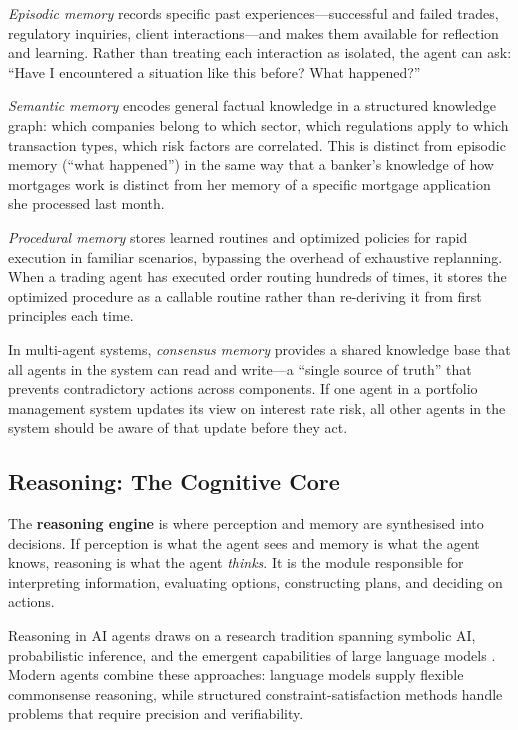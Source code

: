 \documentclass{article}
\begin{document}
\textit{Episodic memory} records specific past experiences—successful and failed trades, regulatory inquiries, client interactions—and makes them available for reflection and learning. Rather than treating each interaction as isolated, the agent can ask: ``Have I encountered a situation like this before? What happened?''

\textit{Semantic memory} encodes general factual knowledge in a structured knowledge graph: which companies belong to which sector, which regulations apply to which transaction types, which risk factors are correlated. This is distinct from episodic memory (``what happened'') in the same way that a banker's knowledge of how mortgages work is distinct from her memory of a specific mortgage application she processed last month.

\textit{Procedural memory} stores learned routines and optimized policies for rapid execution in familiar scenarios, bypassing the overhead of exhaustive replanning. When a trading agent has executed order routing hundreds of times, it stores the optimized procedure as a callable routine rather than re-deriving it from first principles each time.

In multi-agent systems, \textit{consensus memory} provides a shared knowledge base that all agents in the system can read and write—a ``single source of truth'' that prevents contradictory actions across components. If one agent in a portfolio management system updates its view on interest rate risk, all other agents in the system should be aware of that update before they act.

\subsection{Reasoning: The Cognitive Core}
\label{subsec:reasoning}

The \textbf{reasoning engine} is where perception and memory are synthesised
into decisions. If perception is what the agent sees and memory is what the
agent knows, reasoning is what the agent \textit{thinks}. It is the module
responsible for interpreting information, evaluating options, constructing
plans, and deciding on actions.

Reasoning in AI agents draws on a research tradition spanning symbolic AI,
probabilistic inference, and the emergent capabilities of large language
models \cite{wei2022chain}. Modern agents combine these approaches: language
models supply flexible commonsense reasoning, while structured
constraint-satisfaction methods handle problems that require precision and
verifiability.
\end{document}
